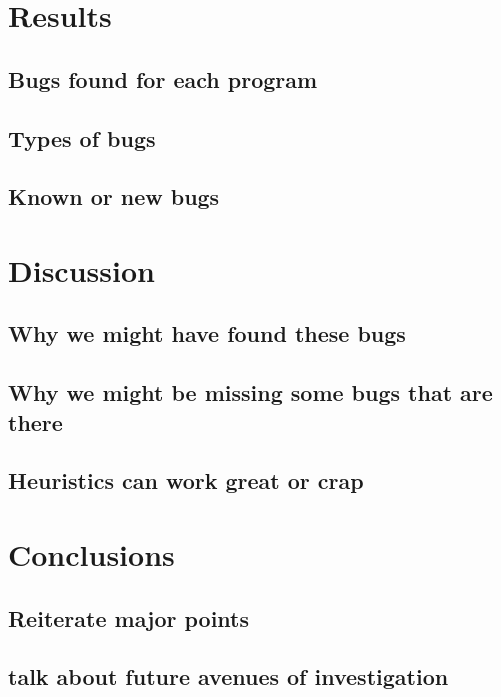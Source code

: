 \documentclass[10pt,]{article} %
\begin{document}
\section{Results}


\subsection{Bugs found for each program}

\subsection{Types of bugs}

\subsection{Known or new bugs}


\section{Discussion}


\subsection{Why we might have found these bugs}

\subsection{Why we might be missing some bugs that are there}

\subsection{Heuristics can work great or crap}


\section{Conclusions}


\subsection{Reiterate major points}

\subsection{talk about future avenues of investigation}
\end{document}
